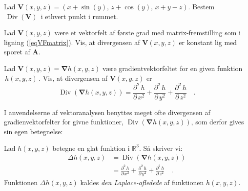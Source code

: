 \begin{exercise}
Lad ${\mathbf{V}}(x,y,z) = (x + \sin(y),\, z + \cos(y),\, x+y-z)$.
Bestem $\,\operatorname{Div}({\mathbf{V}})\,$ i ethvert punkt i rummet.
\end{exercise}

\begin{exercise}
Lad ${\mathbf{V}}(x,y,z)$ være et vektorfelt af
  første grad med matrix-fremstilling som i
ligning (\ref{eqVFmatrix}). Vis, at divergensen
af ${\mathbf{V}}(x,y,z)$ er konstant lig med sporet
af ${\mathbf{A}}$.
\end{exercise}



\begin{exercise}
Lad ${\mathbf{V}}(x,y,z) = {\bm{\nabla}}h(x,y,z)$ være gradientvektorfeltet
for en given funktion $\,h(x,y,z)\,$. Vis, at divergensen af
${\mathbf{V}}(x,y,z)$ er
\begin{equation}
\operatorname{Div}({\bm{\nabla}}h(x,y,z)) = \frac{\partial^{2}\,h}{\partial\,x^{2}} +
\frac{\partial^{2}\,h}{\partial\,y^{2}} +
\frac{\partial^{2}\,h}{\partial\,z^{2}} \quad .
\end{equation}
\end{exercise}

 I anvendelserne af vektoranalysen benyttes meget ofte divergensen af gradienvektorfelter for givne funktioner, $\operatorname{Div}({\bm{\nabla}}h(x,y,z))$, som derfor
gives sin egen betegnelse:

\begin{definition}
Lad $h(x,y,z)$ betegne en glat funktion i $\mathbb{R}^{3}$. Så skriver vi:
\begin{equation}
\begin{aligned}
\Delta h(x,y,z) &= \operatorname{Div}({\bm{\nabla}}h(x,y,z)) \\
 &= \frac{\partial^{2}\,h}{\partial\,x^{2}} +
\frac{\partial^{2}\,h}{\partial\,y^{2}} +
\frac{\partial^{2}\,h}{\partial\,z^{2}} \quad .
\end{aligned}
\end{equation}
Funktionen $\Delta h(x,y,z)$ kaldes {\emph{den Laplace-afledede}} af funktionen $h(x,y,z)$.
\end{definition}


